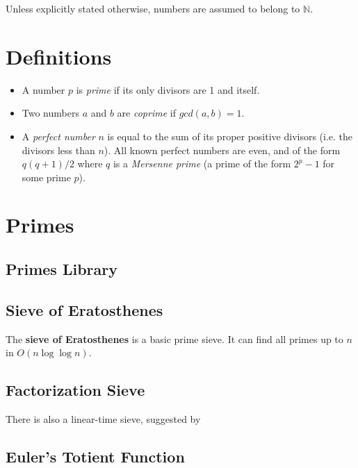\documentclass[../main]{subfiles}
\begin{document}
Unless explicitly stated otherwise, numbers are assumed to belong to $\mathbb{N}$.

\section{Definitions}

    \begin{itemize}
    \item
        A number $p$ is \textit{prime} if its only divisors are 1 and itself.
    \item 
        Two numbers $a$ and $b$ are \textit{coprime} if $gcd(a, b) = 1$. 
    \item
        A \textit{perfect number} $n$ is equal to the sum of its proper positive divisors (i.e. the divisors less than $n$). All known perfect numbers are even, and of the form $q(q+1)/2$ where $q$ is a \textit{Mersenne prime} (a prime of the form $2^p - 1$ for some prime $p$).
    \end{itemize}

\section{Primes}

    \subsection{Primes Library}


    \subsection{Sieve of Eratosthenes}

    The \textbf{sieve of Eratosthenes} is a basic prime sieve. It can find all primes up to $n$ in $O(n\log\log{n})$.\\

    \subsection{Factorization Sieve}

    There is also a linear-time sieve, suggested by 

    \subsection{Euler's Totient Function}
\end{document}
